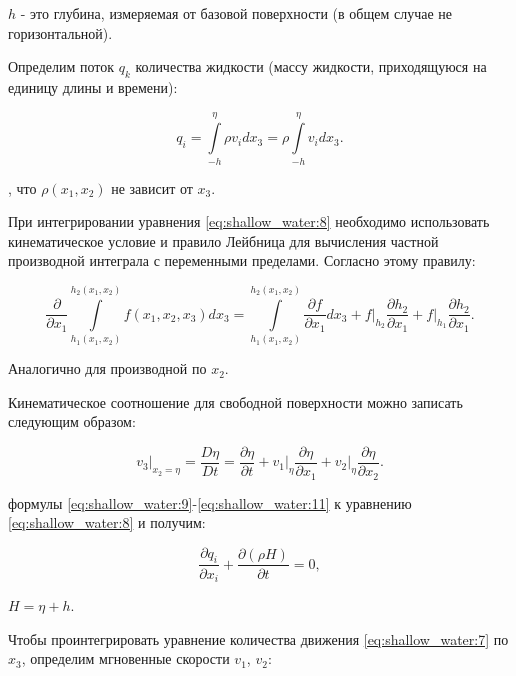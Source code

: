 \documentclass[14pt]{extreport}
\begin{document}
 $h$ - это глубина, измеряемая от базовой поверхности (в общем случае не горизонтальной).

Определим поток $q_k$ количества жидкости (массу жидкости, приходящуюся на единицу длины и времени):

\begin{equation}\label{eq:shallow_water:9}
q_i = \int\limits^\eta_{-h} \rho v_i dx_3 = \rho \int\limits^\eta_{-h} v_i dx_3.
\end{equation}

, что $\rho(x_1, x_2)$ не зависит от $x_3$.

При интегрировании уравнения \ref{eq:shallow_water:8} необходимо использовать кинематическое условие и правило Лейбница \cite{bib:calc:zorich} для вычисления частной производной интеграла с переменными пределами. Согласно этому правилу:


\begin{equation}\label{eq:shallow_water:10}
\frac{\partial}{\partial x_1} \int\limits^{h_2(x_1,x_2)}_{h_1(x_1,x_2)} f(x_1, x_2, x_3) dx_3=\int\limits^{h_2(x_1,x_2)}_{h_1(x_1,x_2)} \frac{\partial f}{\partial x_1} dx_3 + f \bigg|_{h_2}  \frac{\partial h_2}{\partial x_1} + f \bigg|_{h_1} \frac{\partial h_2}{\partial x_1}.
\end{equation}

Аналогично для производной по $x_2$.

Кинематическое соотношение для свободной поверхности можно записать следующим образом:

\begin{equation}\label{eq:shallow_water:11}
v_3\bigg|_{x_2=\eta} = \frac{D\eta}{Dt} = \frac{\partial \eta}{\partial t} + v_1 \bigg|_{\eta} \frac{\partial \eta}{\partial x_1} + v_2 \bigg|_{\eta}\frac{\partial \eta}{\partial x_2}.
\end{equation}

 формулы \ref{eq:shallow_water:9}-\ref{eq:shallow_water:11} к уравнению \ref{eq:shallow_water:8} и получим:

\begin{equation}\label{eq:shallow_water:12}
\frac{ \partial q_i}{\partial x_i} + \frac{\partial(\rho H)}{\partial t} = 0,
\end{equation}

 $H=\eta+h$.

Чтобы проинтегрировать уравнение количества движения \ref{eq:shallow_water:7} по $x_3$, определим мгновенные скорости $v_1$, $v_2$:
\end{document}
